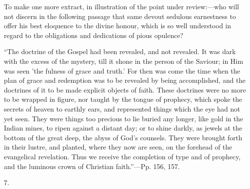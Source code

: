 To make one more extract, in illustration of the
point under review:—who will not discern in the following passage
that same devout sedulous earnestness to offer his best eloquence to
the divine honour, which is so well understood in regard to the
obligations and dedications of pious opulence?

``The
doctrine of the Gospel had been revealed, and not revealed. It was
dark with the excess of the mystery, till it shone in the person of
the Saviour; in Him was seen 'the fulness of grace and truth.' For
then was come the time when the plan of grace and redemption was to be
revealed by being accomplished, and the doctrines of it to be made
explicit objects of faith. These doctrines were no more to be wrapped
in figure, nor taught by the tongue of prophecy, which spoke the
secrets of heaven to earthly ears, and represented things which the
eye had not yet seen. They were things too precious to lie buried any
longer, like gold in the Indian mines, to ripen against a distant day;
or to shine darkly, as jewels at the bottom of the great deep, the
abyss of God's counsels. They were brought forth in their lustre, and
planted, where they now are seen, on the forehead of the evangelical
revelation. Thus we receive the completion of type and of prophecy,
and the luminous crown of Christian faith.''—Pp. 156, 157.

7.

